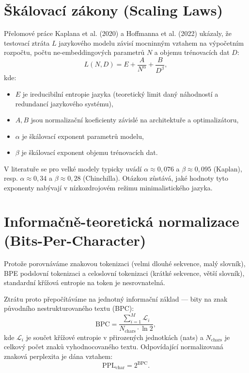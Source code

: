 \section{Škálovací zákony (Scaling Laws)}
Přelomové práce Kaplana et al. (2020) \cite{kaplan2020scaling} a Hoffmanna et al. (2022) \cite{hoffmann2022training} ukázaly, že testovací ztráta $L$ jazykového modelu závisí mocninným vztahem na výpočetním rozpočtu, počtu ne-embeddingových parametrů $N$ a objemu trénovacích dat $D$:
\begin{equation}
    L(N, D) = E + \frac{A}{N^\alpha} + \frac{B}{D^\beta},
    \label{eq:scaling_law}
\end{equation}
kde:
\begin{itemize}
    \item $E$ je ireducibilní entropie jazyka (teoretický limit daný náhodností a redundancí jazykového systému),
    \item $A, B$ jsou normalizační koeficienty závislé na architektuře a optimalizátoru,
    \item $\alpha$ je škálovací exponent parametrů modelu,
    \item $\beta$ je škálovací exponent objemu trénovacích dat.
\end{itemize}

V literatuře se pro velké modely typicky uvádí $\alpha \approx 0{,}076$ a $\beta \approx 0{,}095$ (Kaplan), resp. $\alpha \approx 0{,}34$ a $\beta \approx 0{,}28$ (Chinchilla). Otázkou zůstává, jaké hodnoty tyto exponenty nabývají v nízkozdrojovém režimu minimalistického jazyka.

\section{Informačně-teoretická normalizace (Bits-Per-Character)}
Protože porovnáváme znakovou tokenizaci (velmi dlouhé sekvence, malý slovník), BPE podslovní tokenizaci a celoslovní tokenizaci (krátké sekvence, větší slovník), standardní křížová entropie na token je nesrovnatelná. 

Ztrátu proto přepočítáváme na jednotný informační základ — bity na znak původního nestrukturovaného textu (BPC):
\begin{equation}
    \text{BPC} = \frac{\sum_{i=1}^{M} \mathcal{L}_i}{N_{\text{chars}} \cdot \ln 2},
\end{equation}
kde $\mathcal{L}_i$ je součet křížové entropie v přirozených jednotkách (nats) a $N_{\text{chars}}$ je celkový počet znaků vyhodnocovaného textu. Odpovídající normalizovaná znaková perplexita je dána vztahem:
\begin{equation}
    \text{PPL}_{\text{char}} = 2^{\text{BPC}}.
\end{equation}

